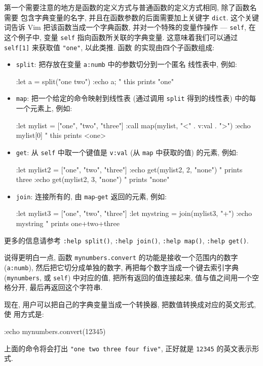 第一个需要注意的地方是函数的定义方式与普通函数的定义方式相同, 除了函数名需要
包含字典变量的名字, 并且在函数参数的后面需要加上关键字 \texttt{dict}.
这个关键词告诉 Vim 把该函数当成一个字典函数, 并对一个特殊的变量作操作 ---
\texttt{self}, 在这个例子中, 变量 \texttt{self} 指向函数所关联的字典变量.
这意味着我们可以通过 \texttt{self[1]} 来获取值 \texttt{"one"}, 以此类推. 函数
的实现由四个子函数组成:
\begin{itemize}
    \item \texttt{split}: 把存放在变量 \texttt{a:numb} 中的参数切分到一个匿名
        线性表中, 例如:
\begin{vimcode}
:let a = split("one two")
:echo a;    " this prints "one"
\end{vimcode}
\item \texttt{map}: 把一个给定的命令映射到线性表 (通过调用 \texttt{split}
    得到的线性表) 中的每一个元素上, 例如:
\begin{vimcode}
:let mylist = ["one", "two", "three"]
:call map(mylist, "<" . v:val . ">")
:echo mylist[0] " this prints <one>
\end{vimcode}
\item \texttt{get}: 从 \texttt{self} 中取一个键值是 \texttt{v:val} (从
    \texttt{map} 中获取的值) 的元素, 例如:
\begin{vimcode}
:let mylist2 = ["one", "two", "three"]
:echo get(mylist2, 2, "none") " prints three
:echo get(mylist2, 3, "none") " prints "none"
\end{vimcode}
\item \texttt{join}: 连接所有的, 由 \texttt{map}-\texttt{get} 返回的元素,
    例如:
\begin{vimcode}
:let mylist3 = ["one", "two", "three"]
:let mystring = join(mylist3, "+")
:echo mystring " prints one+two+three
\end{vimcode}
\end{itemize}
更多的信息请参考 \texttt{:help split()}, \texttt{:help join()},
\texttt{:help map()}, \texttt{:help get()}.

说得更明白一点, 函数 \texttt{mynumbers.convert} 的功能是接收一个范围内的数字
(\texttt{a:numb}), 然后把它切分成单独的数字, 再把每个数字当成一个键去索引字典
(\texttt{mynumbers}, 或 \texttt{self}) 中对应的值, 把所有返回的值连接起来,
值与值之间用一个空格分开, 最后再返回这个字符串.

现在, 用户可以把自己的字典变量当成一个转换器, 把数值转换成对应的英文形式, 使
用方式是:
\begin{vimcode}
:echo mynumbers.convert(12345)
\end{vimcode}
上面的命令将会打出 \texttt{"one two three four five"}, 正好就是 \texttt{12345}
的英文表示形式.  %

